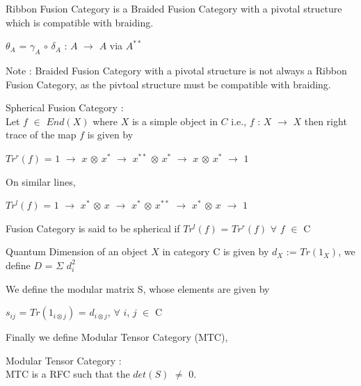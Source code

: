 \begin{defn}
Ribbon Fusion Category is a Braided Fusion Category with a pivotal structure which is compatible with braiding. 
\begin{center}
  $\theta_{A}$ = $\gamma_{A}$ $\circ$ $\delta_{A}$ : $A$ $\rightarrow$ $A$ via $A^{**}$
\end{center}
\end{defn}

\par
Note : Braided Fusion Category with a pivotal structure is not always a Ribbon Fusion Category, as the pivtoal structure must be compatible with braiding.  
\par

\begin{defn}
Spherical Fusion Category : \\
Let $f$ $\in$ $End(X)$ where $X$ is a simple object in $C$ i.e., $f$ : $X$ $\longrightarrow$ $X$ then right trace of the map $f$ is given by
\begin{center}
$Tr^{r}(f)$ = $1$ $\rightarrow$ $x$ $\otimes$ $x^{*}$ $\rightarrow$ $x^{**}$ $\otimes$ $x^{*}$ $\rightarrow$ $x$ $\otimes$ $x^{*}$ $\rightarrow$ $1$
\end{center}
On similar lines,
\begin{center}
$Tr^{l}(f)$ = $1$ $\rightarrow$ $x^{*}$ $\otimes$ $x$ $\rightarrow$ $x^{*}$ $\otimes$ $x^{**}$ $\rightarrow$ $x^{*}$ $\otimes$ $x$ $\rightarrow$ $1$
\end{center}
Fusion Category is said to be spherical if $Tr^{l}(f)$ = $Tr^{r}(f)$ $\forall$ $f$ $\in$ C
\end{defn}

\begin{defn}
Quantum Dimension of an object $X$ in category C is given by $d_{X}$ := $Tr(1_{X})$,
we define $D$ = $\varSigma$ $d_{i}^{2}$
\end{defn}

\begin{defn}
We define the modular matrix S, whose elements are given by
\begin{center}
$s_{ij}$ = $Tr(1_{i \otimes j})$ = $d_{i \otimes j}$, $\forall$ $i$, $j$ $\in$ C
\end{center}
\end{defn}
Finally we define Modular Tensor Category (MTC), 
\begin{defn}
Modular Tensor Category :\\
  MTC is a RFC such that the $det(S)$ $\neq$ $0$.
  
\end{defn}

